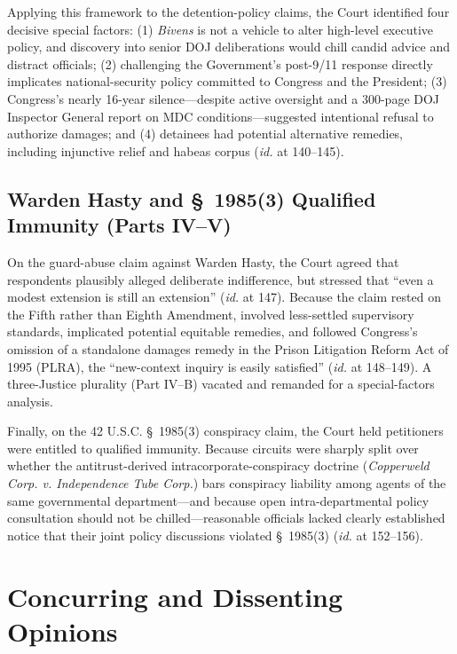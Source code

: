 \documentclass[12pt]{article}
\begin{document}
Applying this framework to the detention-policy claims, the Court identified four decisive special factors: (1) \textit{Bivens} is not a vehicle to alter high-level executive policy, and discovery into senior DOJ deliberations would chill candid advice and distract officials; (2) challenging the Government's post-9/11 response directly implicates national-security policy committed to Congress and the President; (3) Congress's nearly 16-year silence---despite active oversight and a 300-page DOJ Inspector General report on MDC conditions---suggested intentional refusal to authorize damages; and (4) detainees had potential alternative remedies, including injunctive relief and habeas corpus (\textit{id.} at 140--145).

\subsection{Warden Hasty and \S~1985(3) Qualified Immunity (Parts IV--V)}

On the guard-abuse claim against Warden Hasty, the Court agreed that respondents plausibly alleged deliberate indifference, but stressed that ``even a modest extension is still an extension'' (\textit{id.} at 147). Because the claim rested on the Fifth rather than Eighth Amendment, involved less-settled supervisory standards, implicated potential equitable remedies, and followed Congress's omission of a standalone damages remedy in the Prison Litigation Reform Act of 1995 (PLRA), the ``new-context inquiry is easily satisfied'' (\textit{id.} at 148--149). A three-Justice plurality (Part IV--B) vacated and remanded for a special-factors analysis.

Finally, on the 42 U.S.C. \S~1985(3) conspiracy claim, the Court held petitioners were entitled to qualified immunity. Because circuits were sharply split over whether the antitrust-derived intracorporate-conspiracy doctrine (\textit{Copperweld Corp. v. Independence Tube Corp.}) bars conspiracy liability among agents of the same governmental department---and because open intra-departmental policy consultation should not be chilled---reasonable officials lacked clearly established notice that their joint policy discussions violated \S~1985(3) (\textit{id.} at 152--156).

\section{Concurring and Dissenting Opinions}
\end{document}
